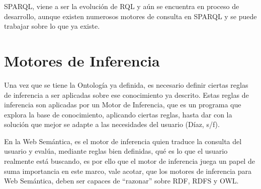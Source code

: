 SPARQL, viene a ser la evolución de RQL y aún se encuentra en proceso de desarrollo, aunque existen numerosos motores de consulta en SPARQL y se puede trabajar sobre lo que ya existe.

\section{Motores de Inferencia}

Una vez que se tiene la Ontología ya definida, es necesario definir ciertas reglas de inferencia a ser aplicadas sobre ese conocimiento ya descrito. Estas reglas de inferencia son aplicadas por un Motor de Inferencia, que es un programa que explora la base de conocimiento, aplicando ciertas reglas, hasta dar con la solución que mejor se adapte a las necesidades del usuario (Díaz, s/f).

En la Web Semántica, es el motor de inferencia quien traduce la consulta del usuario y evalúa, mediante reglas bien definidas, qué es lo que el usuario realmente está buscando, es por ello que el motor de inferencia juega un papel de suma importancia en este marco, vale acotar, que los motores de inferencia para Web Semántica, deben ser capaces de ``razonar'' sobre RDF, RDFS y OWL.

\newpage

